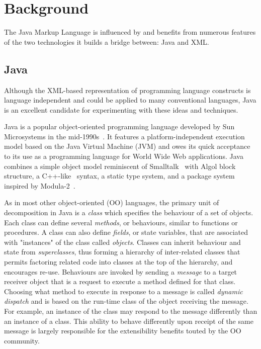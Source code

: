 \documentclass{article}
\begin{document}
\section{Background}
\label{sec-background}

The Java Markup Language is influenced by and benefits from numerous
features of the two technologies it builds a bridge between: Java and
XML.

\subsection{Java}
\label{ssec-java}

Although the XML-based representation of programming language constructs
is language independent and could be applied to many conventional
languages, Java is an excellent candidate for experimenting with these
ideas and techniques.

Java is a popular object-oriented programming language developed by Sun
Microsystems in the mid-1990s~\cite{Java,JavaNutShell}.  It features a
platform-independent execution model based on the Java Virtual Machine
(JVM) and owes its quick acceptance to its use as a programming language
for World Wide Web applications.  Java combines a simple object model
reminiscent of Smalltalk~\cite{Smalltalk} with Algol block structure, a
C++-like~\cite{C++} syntax, a static type system, and a package system
inspired by Modula-2~\cite{Modula2}.

As in most other object-oriented (OO) languages, the primary unit of
decomposition in Java is a \emph{class} which specifies the behaviour of
a set of objects.  Each class can define several \emph{methods}, or
behaviours, similar to functions or procedures. A class can also define
\emph{fields}, or state variables, that are associated with "instances"
of the class called \emph{objects}. Classes can inherit behaviour and
state from \emph{superclasses}, thus forming a hierarchy of
inter-related classes that permits factoring related code into classes
at the top of the hierarchy, and encourages re-use.  Behaviours are
invoked by sending a \emph{message} to a target receiver object that is
a request to execute a method defined for that class.  Choosing what
method to execute in response to a message is called \emph{dynamic
  dispatch} and is based on the run-time class of the object receiving
the message.  For example, an instance of the 
class may respond to the  message differently than an
instance of a  class.  This ability to behave differently
upon receipt of the same message is largely responsible for the
extensibility benefits touted by the OO community.
    
\end{document}
